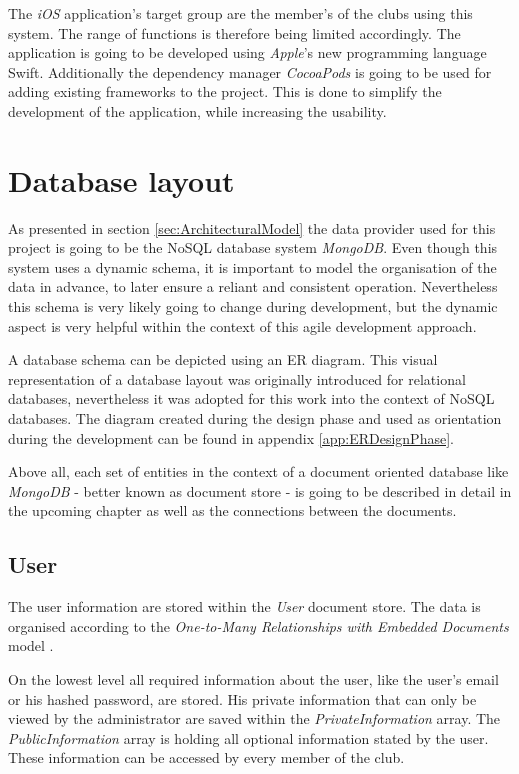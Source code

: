 The \emph{iOS} application's target group are the member's of the clubs using this system. The range of functions is therefore being limited accordingly. The application is going to be developed using \emph{Apple}'s new programming language \gls{Swift}. Additionally the dependency manager \emph{CocoaPods} is going to be used for adding existing frameworks to the project. This is done to simplify the development of the application, while increasing the usability.

\section{Database layout}
\label{sec:DatabaseLayout}

As presented in section \vref{sec:ArchitecturalModel} the data provider used for this project is going to be the \gls{NoSQL} database system \emph{MongoDB}. Even though this system uses a dynamic schema, it is important to model the organisation of the data in advance, to later ensure a reliant and consistent operation. Nevertheless this schema is very likely going to change during development, but the dynamic aspect is very helpful within the context of this agile development approach.

A database schema can be depicted using an \gls{ER} diagram. This visual representation of a database layout was originally introduced for relational databases, nevertheless it was adopted for this work into the context of \gls{NoSQL} databases. The diagram created during the design phase and used as orientation during the development can be found in appendix \vref{app:ERDesignPhase}.

Above all, each set of entities in the context of a document oriented database like \emph{MongoDB} - better known as document store - is going to be described in detail in the upcoming chapter as well as the connections between the documents.

\subsection{User}
The user information are stored within the \emph{User} document store. The data is organised according to the \emph{One-to-Many Relationships with Embedded Documents} model \cite[p. 141]{Mongo:2014aa}.

On the lowest level all required information about the user, like the user's email or his hashed password, are stored. His private information that can only be viewed by the administrator are saved within the \emph{PrivateInformation} array. The \emph{PublicInformation} array is holding all optional information stated by the user. These information can be accessed by every member of the club.


